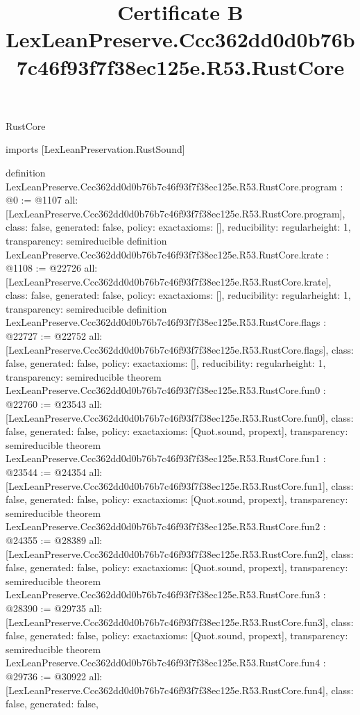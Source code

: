 \begin{lexlean}{RustCore}
\title{Certificate B LexLeanPreserve.Ccc362dd0d0b76b7c46f93f7f38ec125e.R53.RustCore}
\begin{coremodule}
imports [LexLeanPreservation.RustSound]

definition LexLeanPreserve.Ccc362dd0d0b76b7c46f93f7f38ec125e.R53.RustCore.program : @0 := @1107 {
  all: [LexLeanPreserve.Ccc362dd0d0b76b7c46f93f7f38ec125e.R53.RustCore.program],
  class: false,
  generated: false,
  policy: exact{axioms: []},
  reducibility: regular{height: 1},
  transparency: semireducible
}
definition LexLeanPreserve.Ccc362dd0d0b76b7c46f93f7f38ec125e.R53.RustCore.krate : @1108 := @22726 {
  all: [LexLeanPreserve.Ccc362dd0d0b76b7c46f93f7f38ec125e.R53.RustCore.krate],
  class: false,
  generated: false,
  policy: exact{axioms: []},
  reducibility: regular{height: 1},
  transparency: semireducible
}
definition LexLeanPreserve.Ccc362dd0d0b76b7c46f93f7f38ec125e.R53.RustCore.flags : @22727 := @22752 {
  all: [LexLeanPreserve.Ccc362dd0d0b76b7c46f93f7f38ec125e.R53.RustCore.flags],
  class: false,
  generated: false,
  policy: exact{axioms: []},
  reducibility: regular{height: 1},
  transparency: semireducible
}
theorem LexLeanPreserve.Ccc362dd0d0b76b7c46f93f7f38ec125e.R53.RustCore.fun0 : @22760 := @23543 {
  all: [LexLeanPreserve.Ccc362dd0d0b76b7c46f93f7f38ec125e.R53.RustCore.fun0],
  class: false,
  generated: false,
  policy: exact{axioms: [Quot.sound, propext]},
  transparency: semireducible
}
theorem LexLeanPreserve.Ccc362dd0d0b76b7c46f93f7f38ec125e.R53.RustCore.fun1 : @23544 := @24354 {
  all: [LexLeanPreserve.Ccc362dd0d0b76b7c46f93f7f38ec125e.R53.RustCore.fun1],
  class: false,
  generated: false,
  policy: exact{axioms: [Quot.sound, propext]},
  transparency: semireducible
}
theorem LexLeanPreserve.Ccc362dd0d0b76b7c46f93f7f38ec125e.R53.RustCore.fun2 : @24355 := @28389 {
  all: [LexLeanPreserve.Ccc362dd0d0b76b7c46f93f7f38ec125e.R53.RustCore.fun2],
  class: false,
  generated: false,
  policy: exact{axioms: [Quot.sound, propext]},
  transparency: semireducible
}
theorem LexLeanPreserve.Ccc362dd0d0b76b7c46f93f7f38ec125e.R53.RustCore.fun3 : @28390 := @29735 {
  all: [LexLeanPreserve.Ccc362dd0d0b76b7c46f93f7f38ec125e.R53.RustCore.fun3],
  class: false,
  generated: false,
  policy: exact{axioms: [Quot.sound, propext]},
  transparency: semireducible
}
theorem LexLeanPreserve.Ccc362dd0d0b76b7c46f93f7f38ec125e.R53.RustCore.fun4 : @29736 := @30922 {
  all: [LexLeanPreserve.Ccc362dd0d0b76b7c46f93f7f38ec125e.R53.RustCore.fun4],
  class: false,
  generated: false,
}
\end{coremodule}
\end{lexlean}
